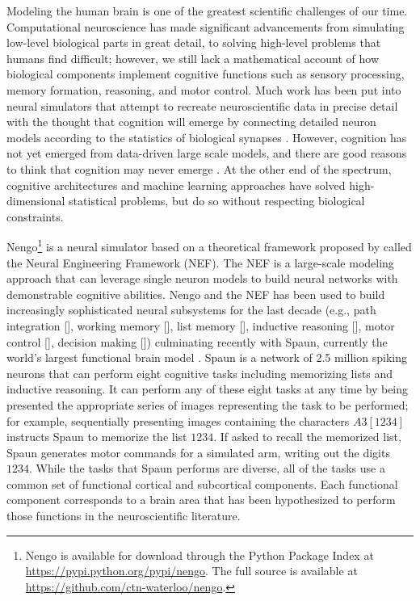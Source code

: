 \documentclass{frontiersSCNS}
\begin{document}
Modeling the human brain
is one of the greatest
scientific challenges of our time.
Computational neuroscience
has made significant advancements
from simulating low-level biological parts in great detail,
to solving high-level problems that humans find difficult;
however, we still lack a mathematical account of
how biological components
implement cognitive functions such as sensory processing,
memory formation, reasoning, and motor control.
Much work has been put into neural simulators
that attempt to recreate neuroscientific
data in precise detail with the thought that
cognition will emerge by connecting
detailed neuron models according
to the statistics of biological synapses \citep{markram2006}.
However, cognition has not yet emerged
from data-driven large scale models,
and there are good reasons to think
that cognition may never emerge \citep{eliasmith2013a}.
At the other end of the spectrum,
cognitive architectures \citep{anderson2004,aisa2008}
and machine learning approaches \citep{hinton2006}
have solved high-dimensional statistical problems,
but do so without respecting biological constraints.

Nengo\footnote{Nengo is available for download through
  the Python Package Index at
  \url{https://pypi.python.org/pypi/nengo}.
  The full source is available at
  \url{https://github.com/ctn-waterloo/nengo}.}
is a neural simulator
based on a theoretical framework proposed
by \citet{eliasmith2003}
called the Neural Engineering Framework
(NEF).
The NEF is a large-scale modeling approach
that can leverage single neuron models
to build neural networks with
demonstrable cognitive abilities.
Nengo and the NEF has been used to build
increasingly sophisticated neural subsystems
for the last decade
(e.g., path integration [\citealp{conklin2005}],
working memory [\citealp{singh2006}],
list memory [\citealp{choo2010}],
inductive reasoning [\citealp{rasmussen2014}],
motor control [\citealp{dewolf2011}],
decision making [\citealp{stewart2012}])
culminating recently with Spaun,
currently the world's
largest functional brain model \citep{eliasmith2012}.
Spaun is a network of 2.5 million spiking neurons
that can perform eight cognitive tasks
including memorizing lists and inductive reasoning.
It can perform any of these eight tasks
at any time by being presented
the appropriate series of images
representing the task to be performed;
for example, sequentially presenting images
containing the characters $A3[1234]$ instructs Spaun
to memorize the list $1234$.
If asked to recall the memorized list,
Spaun generates motor commands for a simulated arm,
writing out the digits $1234$.
While the tasks that Spaun performs are diverse,
all of the tasks use a common set of
functional cortical and subcortical components.
Each functional component corresponds
to a brain area that has been hypothesized
to perform those functions
in the neuroscientific literature.
\end{document}
